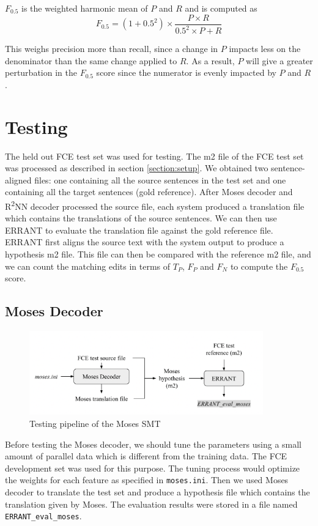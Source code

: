 \documentclass[12pt,a4paper,twoside,openright]{report}
\begin{document}
$F_{0.5}$ is the weighted harmonic mean of $P$ and $R$ and is computed as 
\[F_{0.5}=(1+0.5^2)\times\frac{P\times R}{0.5^2\times P+R}\]

This weighs precision more than recall, since a change in $P$ impacts less on the denominator than the same change applied to $R$. As a result, $P$ will give a greater perturbation in the $F_{0.5}$ score since the numerator is evenly impacted by $P$ and $R$.

\section{Testing}
The held out FCE test set was used for testing. The m2 file of the FCE test set was processed as described in section \ref{section:setup}. We obtained two sentence-aligned files: one containing all the source sentences in the test set and one containing all the target sentences (gold reference). After Moses decoder and R\textsuperscript{2}NN decoder processed the source file, each system produced a translation file which contains the translations of the source sentences. We can then use ERRANT to evaluate the translation file against the gold reference file. ERRANT first aligns the source text with the system output to produce a hypothesis m2 file. This file can then be compared with the reference m2 file, and we can count the matching edits in terms of $T_P$, $F_P$ and $F_N$ to compute the $F_{0.5}$ score.

\subsection{Moses Decoder}
\begin{figure}[ht]
\centering
\includegraphics[width=0.9\textwidth]{images/moses_test.png}
\caption{Testing pipeline of the Moses SMT}
\label{fig:moses_test}
\end{figure}

Before testing the Moses decoder, we should tune the parameters using a small amount of parallel data which is different from the training data. The FCE development set was used for this purpose. The tuning process would optimize the weights for each feature as specified in \texttt{moses.ini}. Then we used Moses decoder to translate the test set and produce a hypothesis file which contains the translation given by Moses. The evaluation results were stored in a file named \texttt{ERRANT\_eval\_moses}.
\end{document}
